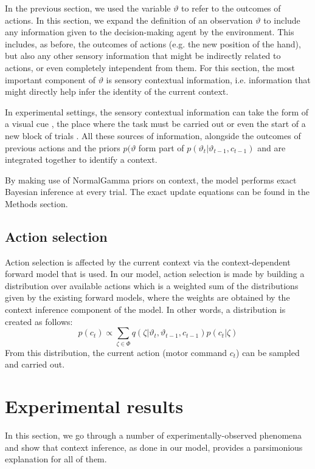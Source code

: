 \documentclass[a4paper,doc,floatsintext,natbib]{apa6}
\begin{document}
In the previous section, we used the variable $\vartheta$ to refer to the outcomes of actions. In this section, we expand the definition of an observation $\vartheta$ to include any information given to the decision-making agent by the environment. This includes, as before, the outcomes of actions (e.g. the new position of the hand), but also any other sensory information that might be indirectly related to actions, or even completely intependent from them. For this section, the most important component of $\vartheta$ is sensory contextual information, i.e. information that might directly help infer the identity of the current context.

In experimental settings, the sensory contextual information can take the form of a visual cue \cite[e.g.][]{Lee_Dual_2009,Kim_Neural_2015}, the place where the task must be carried out \cite[e.g.][]{Forano_Timescales_2020} or even the start of a new block of trials \cite{Ethier_Spontaneous_2008}. All these sources of information, alongside the outcomes of previous actions and the priors $p(\vartheta$ form part of $p(\vartheta_t | \vartheta_{t-1}, c_{t-1})$ and are integrated together to identify a context.

By making use of NormalGamma priors on context, the model performs exact Bayesian inference at every trial. The exact update equations can be found in the Methods section.

\subsection{Action selection}
Action selection is affected by the current context via the context-dependent forward model that is used. In our model, action selection is made by building a distribution over available actions which is a weighted sum of the distributions given by the existing forward models, where the weights are obtained by the context inference component of the model. In other words, a distribution is created as follows:
\begin{equation}
p(c_t) \propto \displaystyle\sum_{\zeta \in \Phi}q(\zeta | \vartheta_t, \vartheta_{t-1}, c_{t-1}) p(c_t | \zeta)
\end{equation}
From this distribution, the current action (motor command $c_t$) can be sampled and carried out.

\section{Experimental results}
In this section, we go through a number of experimentally-observed phenomena and show that context inference, as done in our model, provides a parsimonious explanation for all of them.
\end{document}
